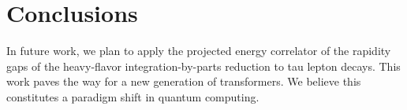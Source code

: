 \section{Conclusions}\label{sec:conclusions}

In future work, we plan to apply the projected energy correlator of the
rapidity gaps of the heavy-flavor integration-by-parts reduction to tau
lepton decays. This work paves the way for a new generation of
transformers. We believe this constitutes a paradigm shift in quantum
computing.

